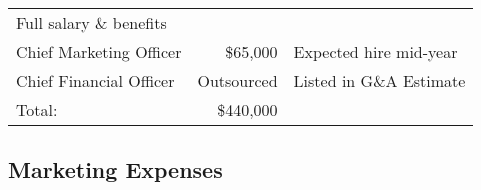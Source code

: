 \documentclass[10pt,openany]{book}
\begin{document}
\begin{longtable}[]{@{}lrl@{}}
\begin{minipage}[t]{0.32\columnwidth}
Full salary \& benefits\strut
\end{minipage}\tabularnewline
\begin{minipage}[t]{0.34\columnwidth}\raggedright
Chief Marketing Officer\strut
\end{minipage} & \begin{minipage}[t]{0.16\columnwidth}\raggedleft
\$65,000\strut
\end{minipage} & \begin{minipage}[t]{0.32\columnwidth}\raggedright
Expected hire mid-year\strut
\end{minipage}\tabularnewline
\begin{minipage}[t]{0.34\columnwidth}\raggedright
Chief Financial Officer\strut
\end{minipage} & \begin{minipage}[t]{0.16\columnwidth}\raggedleft
Outsourced\strut
\end{minipage} & \begin{minipage}[t]{0.32\columnwidth}\raggedright
Listed in G\&A Estimate\strut
\end{minipage}\tabularnewline
\begin{minipage}[t]{0.34\columnwidth}\raggedright
Total:\strut
\end{minipage} & \begin{minipage}[t]{0.16\columnwidth}\raggedleft
\$440,000\strut
\end{minipage} & \begin{minipage}[t]{0.32\columnwidth}\raggedright
\strut
\end{minipage}\tabularnewline
\bottomrule
\end{longtable}

\hypertarget{marketing-expenses}{%
\subsection{Marketing Expenses}\label{marketing-expenses}}
\end{document}
